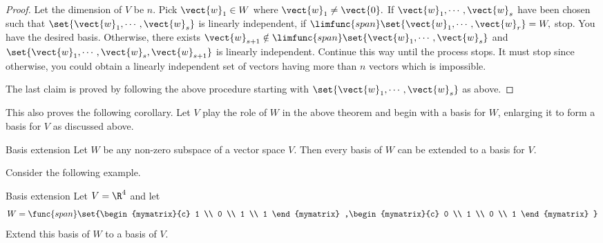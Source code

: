 \begin{proof}
Let the dimension of $V$ be $n$. Pick $\vect{w}_{1}\in W$
where $\vect{w}_{1}\neq \vect{0}.$ If $\vect{w}_{1},\cdots ,\vect{w}_{s}$ have
been chosen such that $\set{\vect{w}_{1},\cdots ,\vect{w}_{s}} $ is
linearly independent, if $\limfunc{span}\set{\vect{w}_{1},\cdots ,\vect{w}
_{r}} =W,$ stop. You have the desired basis. Otherwise, there exists $
\vect{w}_{s+1}\notin \limfunc{span}\set{\vect{w}_{1},\cdots ,\vect{w}
_{s}} $ and $\set{\vect{w}_{1},\cdots ,
\vect{w}_{s},\vect{w}_{s+1}} $ is linearly independent. Continue this
way until the process stops. It must stop since otherwise, you could obtain a
linearly independent set of vectors having more than $n$ vectors which is
impossible.

The last claim is proved by following the above procedure starting with $
\set{\vect{w}_{1},\cdots ,\vect{w}_{s}} $ as above. 
\end{proof}

This also proves the following corollary. Let $V$ play the role of $
W$ in the above theorem and begin with a basis for $W$, enlarging it to form
a basis for $V$ as discussed above.

\begin{corollary}{Basis extension}{}
Let $W$ be any non-zero subspace of a vector space $V$.
Then every basis of $W$ can be extended to a basis for $V$.
\end{corollary}

Consider the following example.

\begin{example}{Basis extension}{}
Let $V=\R^{4}$ and let 
\begin{equation*}
W=\func{span}\set{\begin{mymatrix}{c}
1 \\ 
0 \\ 
1 \\ 
1
\end{mymatrix} ,\begin{mymatrix}{c}
0 \\ 
1 \\ 
0 \\ 
1
\end{mymatrix} }
\end{equation*}
Extend this basis of $W$ to a basis of $V$.
\end{example}

